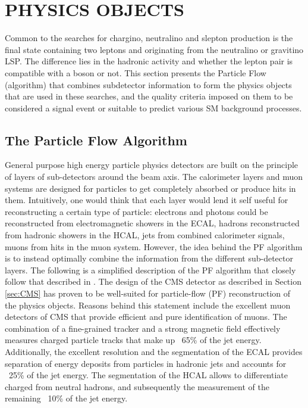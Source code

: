 \chapter{PHYSICS OBJECTS}
Common to the searches for chargino, neutralino and slepton production is the final state containing two leptons and \ptmiss originating from the neutralino or gravitino LSP.
The difference lies in the hadronic activity and whether the lepton pair is compatible with a \PZ boson or not. 
This section presents the Particle Flow (algorithm) that combines subdetector information to form the physics objects that are used in these searches, and the quality criteria imposed on them to be considered a signal event or suitable to predict various SM background processes.  
\section{The Particle Flow Algorithm}\label{sec:PF}
General purpose high energy particle physics detectors are built on the principle of layers of sub-detectors around the beam axis. 
The calorimeter layers and muon systems are designed for particles to get completely absorbed or produce hits in them. 
Intuitively, one would think that each layer would lend it self useful for reconstructing a certain type of particle: electrons and photons could be reconstructed from electromagnetic showers in the ECAL, hadrons reconstructed from hadronic showers in the HCAL, jets from combined calorimeter signals, muons from hits in the muon system. 
However, the idea behind the PF algorithm is to instead optimally combine the information from the different sub-detector layers.   
The following is a simplified description of the PF algorithm that closely follow that described in \cite{Sirunyan:2017ulk}.
The design of the CMS detector as described in Section \ref{sec:CMS} has proven to be well-suited for particle-flow (PF) reconstruction of the physics objects. 
Reasons behind this statement include the excellent muon detectors of CMS that provide efficient and pure identification of muons. 
The combination of a fine-grained tracker and a strong magnetic field effectively measures charged particle tracks that make up ~65\% of the jet energy. 
Additionally, the excellent resolution and the segmentation of the ECAL provides separation of energy deposits from particles in hadronic jets and accounts for ~25\% of the jet energy. 
The segmentation of the HCAL allows to differentiate charged from neutral hadrons, and subsequently the measurement of the remaining ~10\% of the jet energy. 
